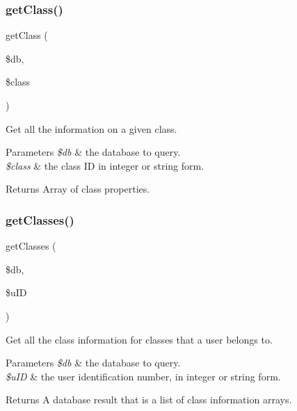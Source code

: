 \subsubsection{\texorpdfstring{get\+Class()}{getClass()}}
{\footnotesize\ttfamily get\+Class (\begin{DoxyParamCaption}\item[{}]{\$db,  }\item[{}]{\$class }\end{DoxyParamCaption})}



Get all the information on a given class. 


\begin{DoxyParams}{Parameters}
{\em \$db} & the database to query. \\
\hline
{\em \$class} & the class ID in integer or string form. \\
\hline
\end{DoxyParams}
\begin{DoxyReturn}{Returns}
Array of class properties. 
\end{DoxyReturn}
\mbox{\label{database_8php_a334f0b901f0d9e607df81e722e2f3458}} 
\subsubsection{\texorpdfstring{get\+Classes()}{getClasses()}}
{\footnotesize\ttfamily get\+Classes (\begin{DoxyParamCaption}\item[{}]{\$db,  }\item[{}]{\$u\+ID }\end{DoxyParamCaption})}



Get all the class information for classes that a user belongs to. 


\begin{DoxyParams}{Parameters}
{\em \$db} & the database to query. \\
\hline
{\em \$u\+ID} & the user identification number, in integer or string form. \\
\hline
\end{DoxyParams}
\begin{DoxyReturn}{Returns}
A database result that is a list of class information arrays. 
\end{DoxyReturn}
\mbox{\label{database_8php_a4162847310de81b83504109485866a7c}} 
